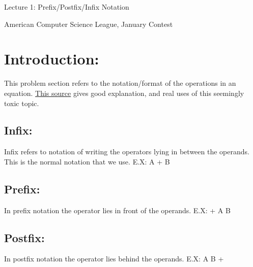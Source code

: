 \documentclass[10pt]{article}
\begin{document}
    \noindent
    \begin{center}

        \hrulefill

        \vspace{5pt}

        \vspace{0pt}

        {\Large \hfill  Lecture 1: Prefix/Postfix/Infix Notation\hfill}
        \vspace{10pt}

        {\large \hfill  American Computer Science League, January Contest\hfill}
        \vspace{10pt}


        \vspace{-3pt}
        \hrulefill
    \end{center}

\section{Introduction:}
This problem section refers to the notation/format of the operations in an equation.
\href{http://interactivepython.org/runestone/static/pythonds/BasicDS/InfixPrefixandPostfixExpressions.html}{This source} gives good explanation, and real uses of this seemingly toxic topic.

\subsection{Infix:}
Infix refers to notation of writing the operators lying in between the operands. This is the normal notation that we use. E.X: A + B

\subsection{Prefix:}
In prefix notation the operator lies in front of the operands. E.X: + A B

\subsection{Postfix:}
In postfix notation the operator lies behind the operands. E.X: A B +
\end{document}

